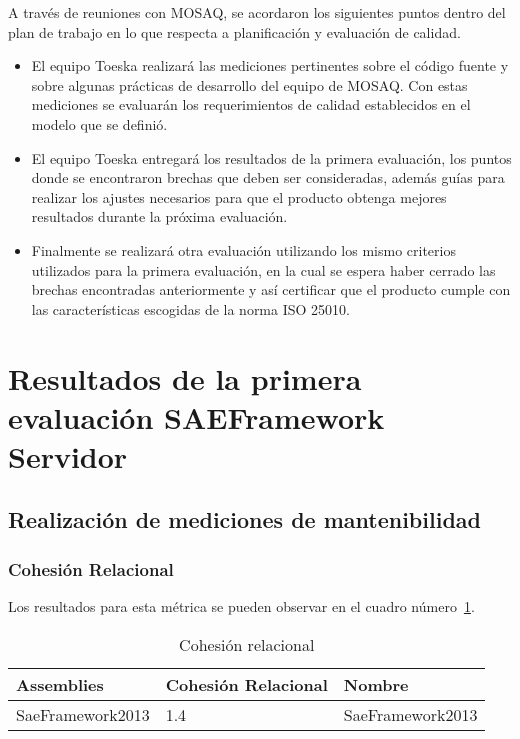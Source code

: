 A través de reuniones con MOSAQ, se acordaron los siguientes puntos dentro del plan de trabajo en lo 
que respecta a planificación y evaluación de calidad.
\begin{itemize}
\item El equipo Toeska realizará las mediciones pertinentes sobre el código fuente y sobre algunas 
prácticas de desarrollo del equipo de MOSAQ. Con estas mediciones se evaluarán los requerimientos de 
calidad establecidos en el modelo que se definió.

\item El equipo Toeska entregará los resultados de la primera evaluación, los puntos donde se encontraron 
brechas que deben ser consideradas, además guías para realizar los ajustes necesarios para que el producto 
obtenga mejores resultados durante la próxima evaluación.

\item Finalmente se realizará otra evaluación utilizando los mismo criterios utilizados 
para la primera evaluación, en la cual se espera haber cerrado las brechas encontradas anteriormente 
y así certificar que el producto cumple con las características escogidas de la norma ISO 25010.
\end{itemize}

\section{Resultados de la primera evaluación SAEFramework Servidor}
\subsection{Realización de mediciones de mantenibilidad}

\subsubsection{Cohesión Relacional}

Los resultados para esta métrica se pueden observar en el cuadro número~\ref{table:CR}.

\begin{table}[hb]
\centering
    \begin{tabular}{|l|l|l|}
    \hline
       \bf{Assemblies}       & \bf{Cohesión Relacional} & \bf{Nombre}           \\ \hline
       SaeFramework2013 & 1.4                   & SaeFramework2013 \\ \hline
    \end{tabular}
    \caption{Cohesión relacional}
    \label{table:CR}
\end{table}


